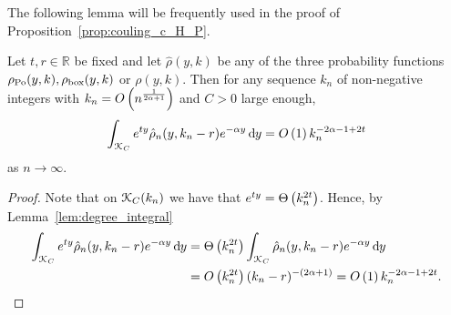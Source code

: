 The following lemma will be frequently used in the proof of Proposition~\ref{prop:couling_c_H_P}.

\begin{lemma} \label{lem:gamma_approx}
Let $t, r \in \mathbb{R}$ be fixed and let $\hat{\rho}(y,k)$ be any of the three probability functions $\rho_{{\mathrm{Po}}}(y,k), \rho_{\text{box}}(y,k)$ or $\rho(y,k)$. Then for any sequence $k_n$ of non-negative integers with $k_n = O\left(n^{\frac{1}{2\alpha + 1}}\right)$ and $C > 0$ large enough,
\[
	\int_{{\mathcal K}_{C}} e^{t y} \hat{\rho}_n(y,k_n-r) e^{-\alpha y} \operatorname{\mathrm{d}\hspace{-2pt}} y = O\left(1\right) k_n^{-2\alpha - 1 + 2t}
\]
as $n \to \infty$.
\end{lemma}
\begin{proof}
Note that on ${\mathcal K}_{C}(k_n)$ we have that $e^{ty} = \Theta\left(k_n^{2t}\right)$. Hence, by Lemma~\ref{lem:degree_integral}
\begin{align*}
	\int_{{\mathcal K}_{C}} e^{t y} \hat{\rho}_n(y,k_n-r) e^{-\alpha y} \operatorname{\mathrm{d}\hspace{-2pt}} y
	&= \Theta\left(k_n^{2t}\right) \int_{{\mathcal K}_{C}} \hat{\rho}_n(y,k_n-r) e^{-\alpha y} \operatorname{\mathrm{d}\hspace{-2pt}} y\\
	&= O\left(k_n^{2t}\right) (k_n-r)^{-(2\alpha + 1)} = O\left(1\right) k_n^{-2\alpha - 1 + 2t}.
\end{align*}
\end{proof}

